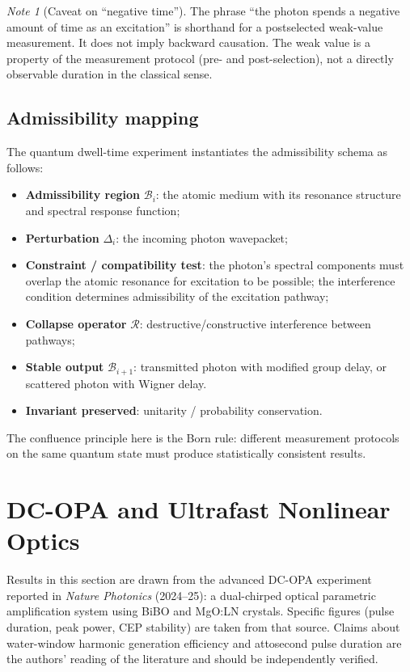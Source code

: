 \documentclass[12pt, a4paper]{article}
\theoremstyle{plain}
\theoremstyle{definition}
\theoremstyle{remark}
\newtheorem{note}[theorem]{Note}
\newcommand{\Rcal}{\mathcal{R}}
\newcommand{\Bcal}{\mathcal{B}}
\begin{document}
\begin{note}[Caveat on ``negative time'']
  The phrase ``the photon spends a negative amount of time as an
  excitation'' is shorthand for a postselected weak-value measurement.
  It does not imply backward causation.
  The weak value is a property of the measurement protocol (pre- and
  post-selection), not a directly observable duration in the
  classical sense.
\end{note}

\subsection{Admissibility mapping}

The quantum dwell-time experiment instantiates the admissibility schema
as follows:
\begin{itemize}
  \item \textbf{Admissibility region} $\Bcal_i$: the atomic medium
        with its resonance structure and spectral response function;
  \item \textbf{Perturbation} $\Delta_i$: the incoming photon wavepacket;
  \item \textbf{Constraint / compatibility test}: the photon's spectral
        components must overlap the atomic resonance for excitation to
        be possible; the interference condition determines
        admissibility of the excitation pathway;
  \item \textbf{Collapse operator} $\Rcal$: destructive/constructive
        interference between pathways;
  \item \textbf{Stable output} $\Bcal_{i+1}$: transmitted photon with
        modified group delay, or scattered photon with Wigner delay.
  \item \textbf{Invariant preserved}: unitarity / probability conservation.
\end{itemize}

The confluence principle here is the Born rule: different measurement
protocols on the same quantum state must produce statistically consistent
results.

\section{DC-OPA and Ultrafast Nonlinear Optics}
\label{sec:optics}

\begin{established}
  Results in this section are drawn from the advanced DC-OPA
  experiment reported in \textit{Nature Photonics} (2024--25):
  a dual-chirped optical parametric amplification system using
  BiBO and MgO:LN crystals.
  Specific figures (pulse duration, peak power, CEP stability)
  are taken from that source.
  Claims about water-window harmonic generation efficiency and
  attosecond pulse duration are the authors' reading of the
  literature and should be independently verified.
\end{established}
\end{document}
